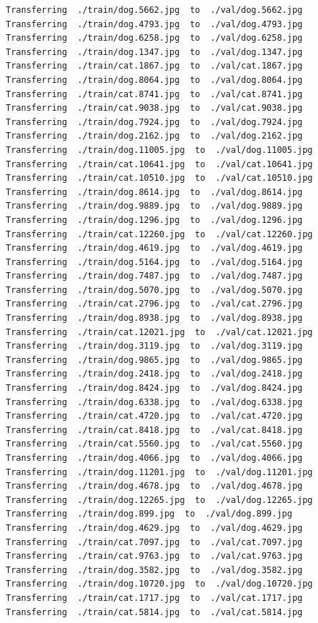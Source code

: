 \documentclass[]{book}
\theoremstyle{definition}
\theoremstyle{definition}
\theoremstyle{definition}
\theoremstyle{remark}
\begin{document}
\begin{verbatim}
Transferring  ./train/dog.5662.jpg  to  ./val/dog.5662.jpg
Transferring  ./train/dog.4793.jpg  to  ./val/dog.4793.jpg
Transferring  ./train/dog.6258.jpg  to  ./val/dog.6258.jpg
Transferring  ./train/dog.1347.jpg  to  ./val/dog.1347.jpg
Transferring  ./train/cat.1867.jpg  to  ./val/cat.1867.jpg
Transferring  ./train/dog.8064.jpg  to  ./val/dog.8064.jpg
Transferring  ./train/cat.8741.jpg  to  ./val/cat.8741.jpg
Transferring  ./train/cat.9038.jpg  to  ./val/cat.9038.jpg
Transferring  ./train/dog.7924.jpg  to  ./val/dog.7924.jpg
Transferring  ./train/dog.2162.jpg  to  ./val/dog.2162.jpg
Transferring  ./train/dog.11005.jpg  to  ./val/dog.11005.jpg
Transferring  ./train/cat.10641.jpg  to  ./val/cat.10641.jpg
Transferring  ./train/cat.10510.jpg  to  ./val/cat.10510.jpg
Transferring  ./train/dog.8614.jpg  to  ./val/dog.8614.jpg
Transferring  ./train/dog.9889.jpg  to  ./val/dog.9889.jpg
Transferring  ./train/dog.1296.jpg  to  ./val/dog.1296.jpg
Transferring  ./train/cat.12260.jpg  to  ./val/cat.12260.jpg
Transferring  ./train/dog.4619.jpg  to  ./val/dog.4619.jpg
Transferring  ./train/dog.5164.jpg  to  ./val/dog.5164.jpg
Transferring  ./train/dog.7487.jpg  to  ./val/dog.7487.jpg
Transferring  ./train/dog.5070.jpg  to  ./val/dog.5070.jpg
Transferring  ./train/cat.2796.jpg  to  ./val/cat.2796.jpg
Transferring  ./train/dog.8938.jpg  to  ./val/dog.8938.jpg
Transferring  ./train/cat.12021.jpg  to  ./val/cat.12021.jpg
Transferring  ./train/dog.3119.jpg  to  ./val/dog.3119.jpg
Transferring  ./train/dog.9865.jpg  to  ./val/dog.9865.jpg
Transferring  ./train/dog.2418.jpg  to  ./val/dog.2418.jpg
Transferring  ./train/dog.8424.jpg  to  ./val/dog.8424.jpg
Transferring  ./train/dog.6338.jpg  to  ./val/dog.6338.jpg
Transferring  ./train/cat.4720.jpg  to  ./val/cat.4720.jpg
Transferring  ./train/cat.8418.jpg  to  ./val/cat.8418.jpg
Transferring  ./train/cat.5560.jpg  to  ./val/cat.5560.jpg
Transferring  ./train/dog.4066.jpg  to  ./val/dog.4066.jpg
Transferring  ./train/dog.11201.jpg  to  ./val/dog.11201.jpg
Transferring  ./train/dog.4678.jpg  to  ./val/dog.4678.jpg
Transferring  ./train/dog.12265.jpg  to  ./val/dog.12265.jpg
Transferring  ./train/dog.899.jpg  to  ./val/dog.899.jpg
Transferring  ./train/dog.4629.jpg  to  ./val/dog.4629.jpg
Transferring  ./train/cat.7097.jpg  to  ./val/cat.7097.jpg
Transferring  ./train/cat.9763.jpg  to  ./val/cat.9763.jpg
Transferring  ./train/dog.3582.jpg  to  ./val/dog.3582.jpg
Transferring  ./train/dog.10720.jpg  to  ./val/dog.10720.jpg
Transferring  ./train/cat.1717.jpg  to  ./val/cat.1717.jpg
Transferring  ./train/cat.5814.jpg  to  ./val/cat.5814.jpg

\end{verbatim}
\end{document}
